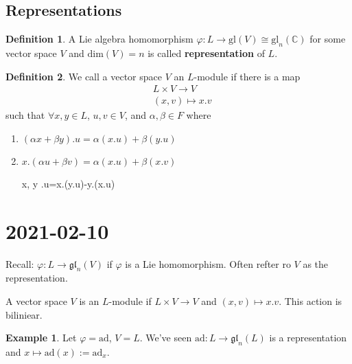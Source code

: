 \documentclass[12pt]{article}
\theoremstyle{definition}
\newtheorem{definition}{Definition}[section]
\theoremstyle{definition}
\newtheorem{exmp}{Example}[section]
\newcommand{\C}{\mathbb{C}}
\begin{document}
            \subsection{Representations}
                \begin{definition}
                    A Lie algebra homomorphism
                    $\varphi:L\to\text{gl}(V)\cong\text{gl}_n(\C)$ for some
                    vector space $V$ and $\text{dim}(V)=n$ is called
                    \textbf{representation} of $L$. 
                \end{definition}
                \begin{definition}
                    We call a vector space $V$ an $L$-module if there is a map
                        \begin{equation*}
                            \begin{split}
                                &L\times V\to V \\
                                &(x, v)\mapsto x.v
                            \end{split}
                        \end{equation*}
                    such that $\forall x, y\in L$, $u, v\in V$, and
                    $\alpha, \beta\in F$ where
                        \begin{enumerate}
                            \item $(\alpha x+\beta y).u=\alpha(x.u)+\beta(y.u)$
                            \item $x.(\alpha u+\beta v)=\alpha(x.u)+\beta(x.v)$
                            \item [x, y].u=x.(y.u)-y.(x.u)
                        \end{enumerate}
                \end{definition}
    \section{2021-02-10}
        Recall: $\varphi:L\to\mathfrak{gl}_{n}(V)$ if $\varphi$ is a Lie
        homomorphism. Often refter ro $V$ as the representation.
        \par\hspace{4mm} A vector space $V$ is an $L$-module if $L\times V\to
        V$ and $(x, v)\mapsto x.v$. This action is biliniear.
        \begin{exmp}
            Let $\varphi=\text{ad}$, $V=L$. We've seen
            $\text{ad}:L\to\mathfrak{gl}_{n}(L)$ is a representation and
            $x\mapsto\text{ad}(x):=\text{ad}_x$.
        \end{exmp}
\end{document}
